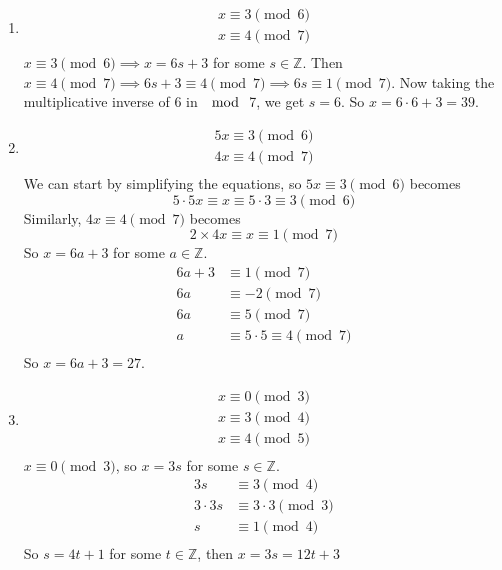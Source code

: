 \documentclass[openany]{report}
\begin{document}
\begin{enumerate}[label=(\alph*)]
    \item 
    \begin{align*}
        x \equiv 3 \pmod{6} \\
        x \equiv 4 \pmod{7} \\
    \end{align*}
    $x \equiv 3 \pmod{6} \implies x = 6s + 3$ for some $s \in \mathbb{Z}$.
    Then $x \equiv 4 \pmod{7} \implies 6s + 3 \equiv 4 \pmod{7} \implies 6s \equiv 1 \pmod{7}$. Now taking the multiplicative inverse of $6$ in $\mod$ 7, we get $s = 6$. So $x = 6 \cdot 6 + 3 = 39$.
    \item 
    \begin{align*}
        5x \equiv 3 \pmod{6} \\
        4x \equiv 4 \pmod{7} \\
    \end{align*}
    We can start by simplifying the equations, so $5x \equiv 3 \pmod{6}$ becomes 
    \[5 \cdot 5x \equiv x \equiv 5 \cdot 3 \equiv 3 \pmod{6}\]
    Similarly, $4x \equiv 4 \pmod{7}$ becomes
    \[2 \times 4x \equiv x \equiv 1 \pmod{7}\]
    So $x = 6a + 3$ for some $a \in \mathbb{Z}$. 
    \begin{align*}
        6a + 3 &\equiv 1 \pmod{7}\\
        6a &\equiv -2 \pmod{7}\\
        6a &\equiv 5 \pmod{7}\\
        a &\equiv 5 \cdot 5 \equiv 4 \pmod{7}\\
    \end{align*}
    So $x = 6a + 3 = 27$. 
    \item 
    \begin{align*}
        x \equiv 0 \pmod{3} \\
        x \equiv 3 \pmod{4} \\
        x \equiv 4 \pmod{5} \\
    \end{align*}
    $x \equiv 0 \pmod{3}$, so $x = 3s$ for some $s \in \mathbb{Z}$. 
    \begin{align*}
        3s &\equiv 3 \pmod{4}\\
        3\cdot 3s &\equiv 3 \cdot 3 \pmod{3}\\
        s &\equiv 1 \pmod{4}\\
    \end{align*}
    So $s = 4t + 1$ for some $t \in \mathbb{Z}$, then $x = 3s = 12t + 3$
    \begin{align*}

\end{align*}
\end{enumerate}
\end{document}
